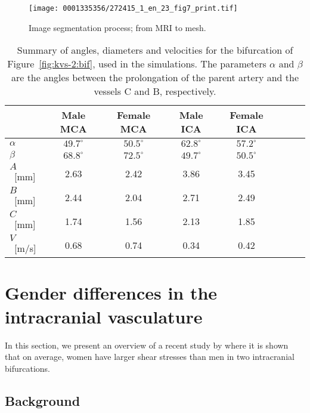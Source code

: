 \begin{figure}[!t]
\centering
\texttt{[image: 0001335356/272415\_1\_en\_23\_fig7\_print.tif]}
\caption{Image segmentation process; from MRI to
mesh.}\label{fig:kvs-2:imagseg}\vspace*{7pt}
\end{figure}

\begin{table}[!t]
\linenumbersep-5.6pc
\centering
\begin{tabular}{l*{6}{c}r}\toprule
& Male MCA & Female MCA & Male ICA & Female ICA \\\midrule
    $\alpha$	  & $49.7^\circ$ & $50.5^\circ$   & $62.8^\circ$ & $57.2^\circ$\\
    $\beta$		  & $68.8^\circ$ & $72.5^\circ$   & $49.7^\circ$ & $50.5^\circ$\\
    $A$~[mm]		  & 2.63 & 2.42   & 3.86 & 3.45\\
    $B$~[mm]           & 2.44 & 2.04   & 2.71 & 2.49\\
    $C$~[mm] 	  & 1.74 & 1.56   & 2.13 & 1.85\\
    $V$~[m/s]	  & 0.68   & 0.74     & 0.34   & 0.42  \\
\bottomrule
\end{tabular}
\caption{Summary of angles, diameters and velocities for the
    bifurcation of Figure~\ref{fig:kvs-2:bif}, used in the
    simulations. The parameters $\alpha$ and $\beta$ are the angles
    between the prolongation of the parent artery and the vessels C
    and B, respectively.}\label{bcs}%
\end{table}


\section{Gender differences in the intracranial vasculature} \label{gender}

In this section, we present an overview of a recent study
by \citet{LindekleivValen-SendstadMorganEtAl2010} where it is shown
that on average, women have larger shear stresses than men in two
intracranial bifurcations.

\subsection{Background}

